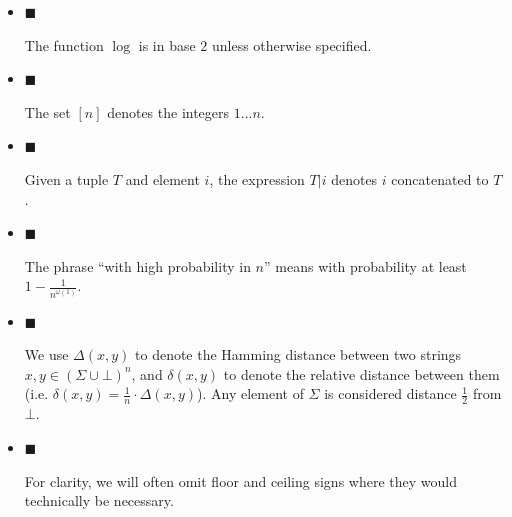 \documentclass[10pt,a4paper]{article}
\begin{document}
\begin{itemize}


\item[] 
$\blacksquare$ 


The function $\log$ is in base $2$ unless otherwise specified.\par





\item[] 
$\blacksquare$ 


The set $[n]$ denotes the integers $1\ldots n$.\par





\item[] 
$\blacksquare$ 


Given a tuple $T$ and element $i$, the expression $T|i$ denotes $i$ concatenated to $T$.\par





\item[] 
$\blacksquare$ 


The phrase “with high probability in $n$” means with probability at least $1-\frac{1}{n^{\omega(1)}}$.\par





\item[] 
$\blacksquare$ 


We use $\Delta(x,y)$ to denote the Hamming distance between two strings $x,y\in(\Sigma\cup\bot)^{n}$, and $\delta(x,y)$ to denote the relative distance between them (i.e. $\delta(x,y)=\frac{1}{n}\cdot\Delta(x,y)$). Any element of $\Sigma$ is considered distance $\frac{1}{2}$ from $\bot$.\par





\item[] 
$\blacksquare$ 


For clarity, we will often omit floor and ceiling signs where they would technically be necessary.\par





\end{itemize}



\end{document}

